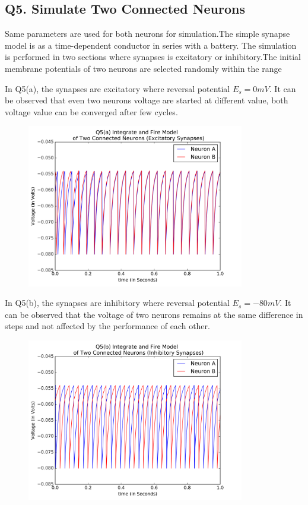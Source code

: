 \documentclass[DIV=calc, paper=a4, fontsize=12pt, twocolumn]{article}	 %
\begin{document}
	\subsection*{Q5. Simulate Two Connected Neurons}
	Same parameters are used for both neurons for simulation.The simple synapse model is as a time-dependent conductor in series with a battery. The simulation is performed in two sections where synapses is excitatory or inhibitory.The initial membrane potentials of two neurons are selected randomly within the range
	\par 
	In Q5(a), the synapses are excitatory where reversal potential $E_s = 0 mV$. It can be observed that even two neurons voltage are started at different value, both voltage value can be converged after few cycles.
		\begin{figure}[H]
			\includegraphics*[width = 9.5cm]{Q5a}
		\end{figure}
	In Q5(b), the synapses are inhibitory where reversal potential $E_s = -80 mV$. It can be observed that the voltage of two neurons remains at the same difference in steps and not affected by the performance of each other.
		\begin{figure}[H]
			\includegraphics*[width = 9.5cm]{Q5b}
		\end{figure}
    \bigskip
    \bigskip
\end{document}
